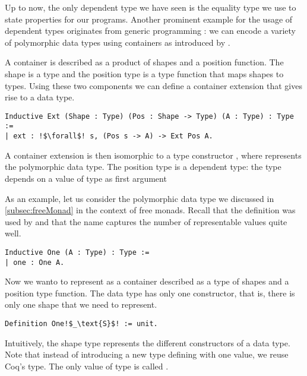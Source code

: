 Up to now, the only dependent type we have seen is the equality type we use to state properties for our programs.
Another prominent example for the usage of dependent types originates from generic programming \citep{altenkirch2003generic,hinze2000new}: we can encode a variety of polymorphic data types using containers as introduced by \citet{abbott2003categories}.

A container is described as a product of shapes and a position function.
The shape is a type  and the position type  is a type function that maps shapes to types.
Using these two components we can define a container extension that gives rise to a data type.

\begin{verbatim}
Inductive Ext (Shape : Type) (Pos : Shape -> Type) (A : Type) : Type :=
| ext : !$\forall$! s, (Pos s -> A) -> Ext Pos A.
\end{verbatim}

A container extension  is then isomorphic to a type constructor , where  represents the polymorphic data type.
The position type  is a dependent type: the type depends on a value of type  as first argument

As an example, let us consider the polymorphic data type  we discussed in \autoref{subsec:freeMonad} in the context of free monads.
Recall that the definition was used by \citet{swierstra2008data} and that the name captures the number of representable values quite well.

\begin{verbatim}
Inductive One (A : Type) : Type :=
| one : One A.
\end{verbatim}

Now we wanto to represent  as a container described as a type of shapes and a position type function.
The data type  has only one constructor, that is, there is only one shape that we need to represent.

\begin{verbatim}
Definition One!$_\text{S}$! := unit.
\end{verbatim}

Intuitively, the shape type represents the different constructors of a data type.
Note that instead of introducing a new type defining with one value, we reuse Coq's  type.
The only value of type  is called .

